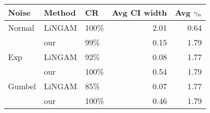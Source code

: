 \begin{tabular}{lllrr}
       \toprule
       Noise  & Method & CR    & Avg CI width & Avg $\gamma_n$ \\
       \midrule
       Normal & LiNGAM & 100\% & 2.01         & 0.64                           \\
              & our    & 99\%  & 0.15         & 1.79                           \\
       Exp    & LiNGAM & 92\%  & 0.08         & 1.77                           \\
              & our    & 100\% & 0.54         & 1.79                           \\
       Gumbel & LiNGAM & 85\%  & 0.07         & 1.77                           \\
              & our    & 100\% & 0.46         & 1.79                           \\
       \bottomrule
\end{tabular}
